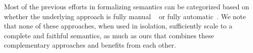 
%
%

Most of the previous efforts in formalizing \ISA semantics can be categorized based on whether the underlying approach is fully manual ~\cite{Goel:FMCAD14, TSL:TOPLAS13, Leroy:2009, sail-x86} or fully automatic~\cite{Heule2016a, Roessle:CPP19, Hasabnis:ASPLOS16, Hasabnis:FSE16}. We note that none of these approaches, when used in isolation, sufficiently scale to a complete and faithful semantics, as much as ours that combines these complementary approaches and benefits from each other.


